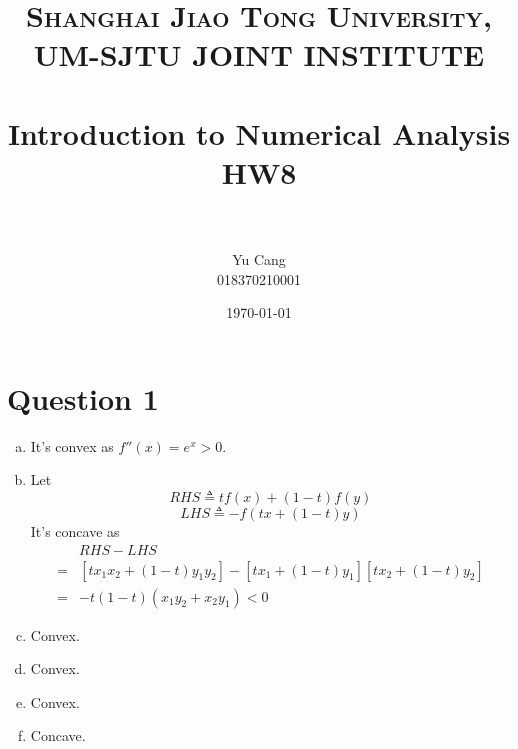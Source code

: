 \documentclass[paper=a4, fontsize=11pt]{scrartcl} %
\title{	
\normalfont \normalsize 
\textsc{Shanghai Jiao Tong University, UM-SJTU JOINT INSTITUTE} \\ [25pt] %
\horrule{0.5pt} \\[0.4cm] %
\huge Introduction to Numerical Analysis \\ HW8 \\ %
\horrule{2pt} \\[0.5cm] %
}
\author{Yu Cang \\ 018370210001} %
\date{\normalsize \today} %
\numberwithin{equation}{section} %
\numberwithin{figure}{section} %
\numberwithin{table}{section} %
\begin{document}
\maketitle %

\section{Question 1}
	\begin{enumerate}[(a)]
		\item
			It's convex as $f''(x) = e^x > 0$.
		\item 
			Let
			\begin{equation}
				RHS \triangleq t f(x) + (1-t)f(y)
			\end{equation}
			\begin{equation}
				LHS \triangleq - f(tx+(1-t)y)
			\end{equation}
			It's concave as
			\begin{equation}
				\begin{aligned}
				  & RHS-LHS\\
						   = &[t x_1 x_2 + (1-t)y_1 y_2] -[t x_1 + (1-t)y_1][t x_2 + (1-t)y_2]\\
						   = &-t(1-t)(x_1 y_2 + x_2 y_1) < 0
				\end{aligned}
			\end{equation}
		\item 
			Convex.
			
		\item 
			Convex.
			
		\item 
			Convex.
			
		\item 
			Concave.

	\end{enumerate}
\end{document}
